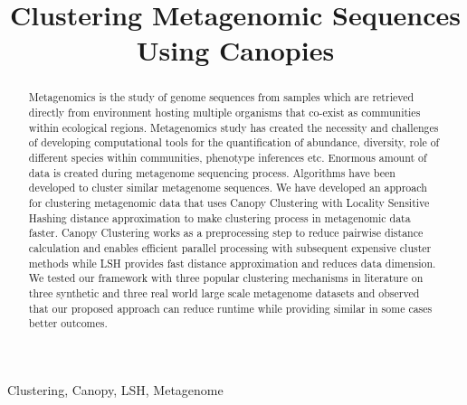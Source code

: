 \documentclass[10pt, conference, compsocconf]{IEEEtran}
\begin{document}
\title{Clustering Metagenomic Sequences Using Canopies}

\author{
}
\maketitle

\begin{abstract}

Metagenomics is the study of genome sequences from samples which are retrieved directly from environment hosting multiple organisms that co-exist as communities within ecological regions. Metagenomics study has created the necessity and challenges of developing computational tools for the quantification of abundance, diversity, role of different species within communities, phenotype inferences etc. Enormous amount of data is created during metagenome sequencing process. Algorithms have been developed to cluster similar metagenome sequences. We have developed an approach for clustering metagenomic data that uses Canopy Clustering with Locality Sensitive Hashing distance approximation to make clustering process in metagenomic data faster. Canopy Clustering works as a preprocessing step to reduce pairwise distance calculation and enables efficient parallel processing with subsequent expensive cluster methods while LSH provides fast distance approximation and reduces data dimension. We tested our framework with three popular clustering mechanisms in literature on three synthetic and three real world large scale metagenome datasets and observed that our proposed approach can reduce runtime while providing similar in some cases better outcomes.

\end{abstract}

\begin{IEEEkeywords}
Clustering, Canopy, LSH, Metagenome
\end{IEEEkeywords}

%
\IEEEpeerreviewmaketitle
\end{document}
